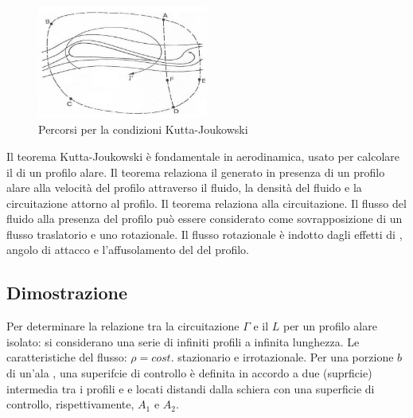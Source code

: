 \begin{figure}
\centering
\includegraphics[width = 0.5\textwidth]{gfx/KuttaJoukowski}
\caption{Percorsi per la condizioni Kutta-Joukowski}
\label{fig:KuttaJoukowski}
\end{figure} 

Il teorema Kutta-Joukowski è fondamentale in aerodinamica, usato per calcolare il  di un profilo alare.
Il teorema relaziona il  generato in presenza di un profilo alare alla velocità del profilo attraverso il fluido, la densità del fluido e la circuitazione attorno al profilo.
Il teorema relaziona  alla circuitazione. Il flusso del fluido alla presenza del profilo può essere considerato come sovrapposizione di un flusso traslatorio e uno rotazionale.
Il flusso rotazionale è indotto dagli effetti di , angolo di attacco e l'affusolamento del  del profilo.

\subsection{Dimostrazione}
Per determinare la relazione tra la circuitazione $\Gamma$ e il  $L$ per un profilo alare isolato: si considerano una serie di infiniti profili a infinita lunghezza.
Le caratteristiche del flusso: $\rho = cost.$ stazionario e irrotazionale.
Per una porzione $b$ di un'ala , una superifcie di controllo è definita in accordo a due  (suprficie) intermedia tra i profili e  e  locati distandi dalla schiera con una superficie di controllo, rispettivamente, $A_1$ e $A_2$.

